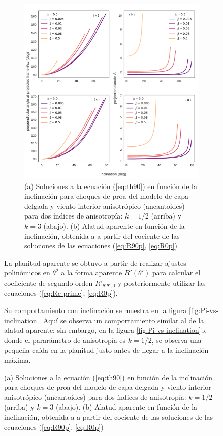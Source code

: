 \begin{figure}
\begin{figure}
  \centering
  \includegraphics[width=\linewidth]{./Figures/ancantoid-th90-vs-i}
  \caption{(a) Soluciones a la ecuación (\ref{eq:th90}) en función de la inclinación para choques de proa del modelo de capa delgada y viento interior anisotrópico (ancantoides) para dos índices de anisotropía: $k=1/2$ (arriba) y $k=3$ (abajo). (b) Alatud aparente en función de la inclinación, obtenida a a partir del cociente de las soluciones de las ecuaciones (\ref{eq:R90p}, \ref{eq:R0p})}
  \label{fig:t90-anisotropic}
\end{figure}

La planitud aparente se obtuvo a partir de realizar ajustes polinómicos en $\theta^2$ a la forma aparente $R'(\theta')$ para calcular el coeficiente de segundo orden $R'_{\theta'\theta', 0}$ y posteriormente utilizar las ecuaciones (\ref{eq:Rc-prime}, \ref{eq:R0p}). 

Su comportamiento con inclinación se muestra en la figura \ref{fig:Pi-vs-inclination}. Aquí se observa un comportamiento similar al de la alatud aparente; sin embargo, en la figura \ref{fig:Pi-vs-inclination}b, donde el pararámetro de anisotropía es $k=1/2$, se observa una pequeña caída en la planitud justo antes de llegar a la inclinación máxima. 


\end{figure}
